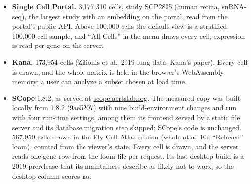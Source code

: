 \documentclass[11pt]{article}
\begin{document}
\begin{itemize}[nosep]
\item \textbf{Single Cell Portal.} 3,177,310 cells, study SCP2805 (human retina, snRNA-seq), the largest study with an embedding on the portal, read from the portal's public API. Above 100,000 cells the default view is a stratified 100,000-cell sample, and ``All Cells'' in the menu draws every cell; expression is read per gene on the server.
\item \textbf{Kana.} 173,954 cells (Zilionis et al.\ 2019 lung data, Kana's paper). Every cell is drawn, and the whole matrix is held in the browser's WebAssembly memory; a user can analyze a subset chosen at load time.
\item \textbf{SCope} 1.8.2, as served at \href{https://scope.aertslab.org}{scope.aertslab.org}. The measured copy was built locally from 1.8.2 (9ae5207) with nine build-environment changes and run with four run-time settings, among them its frontend served by a static file server and its database migration step skipped; SCope's code is unchanged. 567,950 cells drawn in the Fly Cell Atlas session (whole-atlas 10x ``Relaxed'' loom), counted from the viewer's state. Every cell is drawn, and the server reads one gene row from the loom file per request. Its last desktop build is a 2019 prerelease that its maintainers describe as likely not to work, so the desktop column scores no.

\end{itemize}
\end{document}
